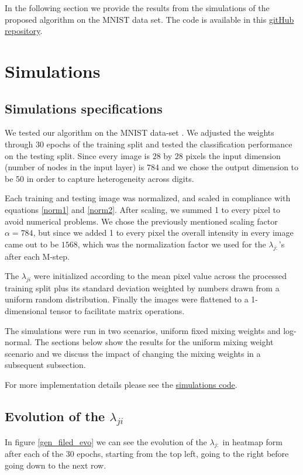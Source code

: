 \documentclass{article}
\begin{document}
In the following section we provide the results from the simulations of the proposed algorithm on the MNIST data set. The code is available in this \href{https://github.com/Sann5/neural_populations}{\color{draculacyan} gitHub repository}.
 
\section{Simulations}
\subsection{Simulations specifications}
We tested our algorithm on the MNIST data-set \cite{deng2012mnist}. We adjusted the weights through 30 epochs of the training split and tested the classification performance on the testing split. Since every image is $28$ by $28$ pixels the input dimension (number of nodes in the input layer) is $784$ and we chose the output dimension to be 50 in order to capture heterogeneity across digits.
 
Each training and testing image was normalized, and scaled in compliance with equations \eqref{norm1} and \eqref{norm2}. After scaling, we summed 1 to every pixel to avoid numerical problems. We chose the previously mentioned scaling factor $\alpha = 784$, but since we added 1 to every pixel the overall intensity in every image came out to be $1568$, which was the normalization factor we used for the $\lambda_{j:}$'s after each M-step. 
 
The \(\lambda_{ji}\) were initialized according to the mean pixel value across the processed training split plus its standard deviation weighted by numbers drawn from a uniform random distribution. Finally the images were flattened to a 1-dimensional tensor to facilitate matrix operations.
 
The simulations were run in two scenarios, uniform fixed mixing weights and log-normal. The sections below show the results for the uniform mixing weight scenario and we discuss the impact of changing the mixing weights in a subsequent subsection.
 
For more implementation details please see the \href{https://github.com/Sann5/neural_populations}{\color{draculacyan} simulations code}.
 
\subsection{Evolution of the $\lambda_{ji}$}
In figure \ref{gen_filed_evo} we can see the evolution of the \(\lambda_{j:}\) in heatmap form after each of the 30 epochs, starting from the top left, going to the right before going down to the next row.
 
\end{document}
